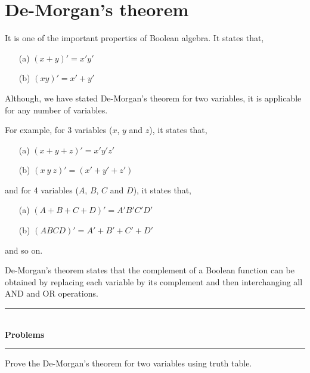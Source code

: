 \section{De-Morgan's theorem}\label{sec5.13}

It is one of the important properties of Boolean algebra. It states that,
\begin{itemize}
\item[(a)] $(x+y)'=x'y'$

\item[(b)] $(xy)'=x'+y'$
\end{itemize}

Although, we have stated De-Morgan's theorem for two variables, it is applicable for any number of variables.

For example, for 3 variables ($x$, $y$ and $z$), it states that,
\begin{itemize}
\item[(a)] $(x+y+z)'=x'y'z'$

\item[(b)] $(x \ y \ z)'=(x'+y'+z')$
\end{itemize}
and for 4 variables ($A$, $B$, $C$ and $D$), it states that,
\begin{itemize}
\item[(a)] $(A+B+C+D)'=A'B'C'D'$

\item[(b)] $(ABCD)'=A'+B'+C'+D'$
\end{itemize}
and so on.

De-Morgan's theorem states that the complement of a Boolean function can be obtained by replacing each variable by its complement and then interchanging all AND and OR operations.

\begin{center}
\rule{4cm}{1pt}\\
{\bf\Large Problems}\\[-3pt]
\rule{4cm}{1pt}
\end{center}

\begin{problem}\label{prob5.51}
Prove the De-Morgan's theorem for two variables using truth table.
\end{problem}

